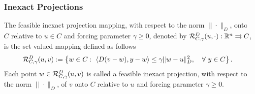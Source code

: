 \begin{frame}[t]\frametitle{Inexact Projections}
  \begin{definition}[2.10]
    The \textcolor{UFGred}{feasible inexact projection mapping}, with respect to the norm $\| \cdot \|_{D}$,  onto $C$ relative to $u \in C$ and forcing parameter $\gamma\geq 0$, denoted by ${\cal R}_{C,\gamma}^{D}(u, \cdot): {\mathbb R}^n \rightrightarrows C$,  is the set-valued mapping defined as follows
    \begin{equation*}
      {\cal R}_{C,\gamma}^{D}(u, v):= \left\{w\in C:~\left\langle D(v-w), y-w \right\rangle \leq \gamma \|w-u\|_{D}^2, \quad \forall~ y \in C \right\}.
    \end{equation*}
    Each point $w\in {\cal R}_{C,\gamma}^{D}(u, v)$ is called a feasible inexact projection,  with respect to the norm $\| \cdot \|_{D}$,  of $v$ onto $C$ relative to $u$ and forcing parameter $\gamma\geq 0$.
  \end{definition}
\end{frame}

